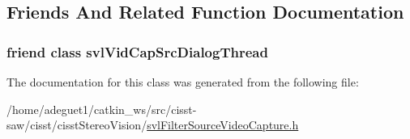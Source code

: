 \subsection{Friends And Related Function Documentation}
\hypertarget{classsvl_filter_source_video_capture_aa65165c939d276c4378a32c5405f83d4}{
\subsubsection[{svl\-Vid\-Cap\-Src\-Dialog\-Thread}]{\setlength{\rightskip}{0pt plus 5cm}friend class {\bf svl\-Vid\-Cap\-Src\-Dialog\-Thread}\hspace{0.3cm}{\ttfamily [friend]}}}\label{classsvl_filter_source_video_capture_aa65165c939d276c4378a32c5405f83d4}


The documentation for this class was generated from the following file\-:\begin{DoxyCompactItemize}
\item 
/home/adeguet1/catkin\-\_\-ws/src/cisst-\/saw/cisst/cisst\-Stereo\-Vision/\hyperlink{svl_filter_source_video_capture_8h}{svl\-Filter\-Source\-Video\-Capture.\-h}\end{DoxyCompactItemize}
